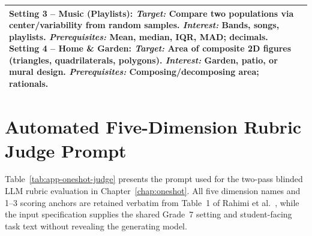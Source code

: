 {\begin{table}[!htbp]
{\begin{tabular}{@{} >{\raggedright\arraybackslash}p{} >{\raggedright\arraybackslash}p{} @{}}
\textbf{Setting 3 -- Music (Playlists):} \emph{Target:} Compare two populations via center/variability from random samples. \emph{Interest:} Bands, songs, playlists. \emph{Prerequisites:} Mean, median, IQR, MAD; decimals.\newline
\textbf{Setting 4 -- Home \& Garden:} \emph{Target:} Area of composite 2D figures (triangles, quadrilaterals, polygons). \emph{Interest:} Garden, patio, or mural design. \emph{Prerequisites:} Composing/decomposing area; rationals. \\
\bottomrule
\end{tabular}
}
\end{table}
\clearpage

\section{Automated Five-Dimension Rubric Judge Prompt}
\label{app:oneshot-judge}
\vspace{-0.4em}
Table~\ref{tab:app-oneshot-judge} presents the prompt used for the two-pass blinded LLM rubric evaluation in Chapter~\ref{chap:oneshot}. All five dimension names and 1--3 scoring anchors are retained verbatim from Table~1 of Rahimi et al.~\cite{rahimi2025}, while the input specification supplies the shared Grade~7 setting and student-facing task text without revealing the generating model.

}
